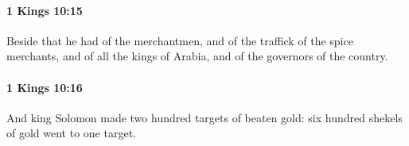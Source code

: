 		\paragraph{1 Kings 10:15} %
			\label{1KINGS-10-15}

			Beside that he had of the merchantmen, and of the traffick of the spice merchants, and of all the kings of Arabia, and of the governors of the country.


		\paragraph{1 Kings 10:16} %
			\label{1KINGS-10-16}

			And king Solomon made two hundred targets of beaten gold: six hundred shekels of gold went to one target.


